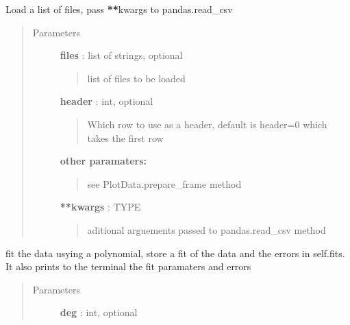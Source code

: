\documentclass[letterpaper,10pt,english]{sphinxmanual}
\begin{document}
\begin{fulllineitems}
\begin{fulllineitems}
\label{pubplots:pubplots.plotdata.PlotData.filelist}
Load a list of files, pass {\color{red}\bfseries{}**}kwargs to pandas.read\_csv
\begin{quote}\begin{description}
\item[{Parameters}] \leavevmode
\textbf{files} : list of strings, optional
\begin{quote}

list of files to be loaded
\end{quote}

\textbf{header} : int, optional
\begin{quote}

Which row to use as a header, default is header=0 which takes the first row
\end{quote}

\textbf{other paramaters:}
\begin{quote}

see PlotData.prepare\_frame method
\end{quote}

\textbf{**kwargs} : TYPE
\begin{quote}

aditional arguements passed to pandas.read\_csv method
\end{quote}

\end{description}\end{quote}

\end{fulllineitems}


\begin{fulllineitems}
\label{pubplots:pubplots.plotdata.PlotData.fit}
fit the data usying a polynomial, store a fit of the data and the errors in self.fits.
It also prints to the terminal the fit paramaters and errors
\begin{quote}\begin{description}
\item[{Parameters}] \leavevmode
\textbf{deg} : int, optional
\begin{quote}


\end{quote}
\end{description}
\end{quote}
\end{fulllineitems}
\end{fulllineitems}
\end{document}
